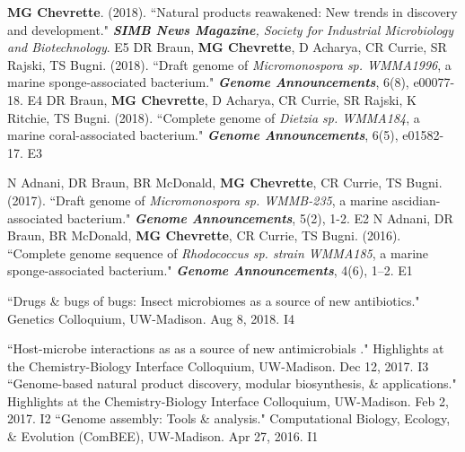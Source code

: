 \begin{cvpubs}
  \cvpub
    {\textbf{MG Chevrette}. (2018). ``Natural products reawakened: New trends in discovery and development." \textit{\textbf{SIMB News Magazine}, Society for Industrial Microbiology and Biotechnology}. }  %
    {E5} %
  \cvpub
    {DR Braun, \textbf{MG Chevrette}, D Acharya, CR Currie, SR Rajski, TS Bugni. (2018). ``Draft genome of \textit{Micromonospora sp. WMMA1996}, a marine sponge-associated bacterium." \textit{\textbf{Genome Announcements}}, 6(8), e00077-18. \textbf{\textit{}} }  %
    {E4} %
  \cvpub
    {DR Braun, \textbf{MG Chevrette}, D Acharya, CR Currie, SR Rajski, K Ritchie, TS Bugni. (2018). ``Complete genome of \textit{Dietzia sp. WMMA184}, a marine coral-associated bacterium." \textit{\textbf{Genome Announcements}}, 6(5), e01582-17. \textbf{\textit{}} } %
    {E3} %
\end{cvpubs}
\begin{cvpubs}
  \cvpub
    {N Adnani, DR Braun, BR McDonald, \textbf{MG Chevrette}, CR Currie, TS Bugni. (2017). ``Draft genome of \textit{Micromonospora sp. WMMB-235}, a marine ascidian-associated bacterium." \textit{\textbf{Genome Announcements}}, 5(2), 1-2. \textbf{\textit{}} } %
    {E2} %
  \cvpub
  {N Adnani, DR Braun, BR McDonald, \textbf{MG Chevrette}, CR Currie, TS Bugni. (2016). ``Complete genome sequence of \textit{Rhodococcus sp. strain WMMA185}, a marine sponge-associated bacterium." \textit{\textbf{Genome Announcements}}, 4(6), 1–2. \textbf{\textit{}}} %
    {E1} %
\end{cvpubs}


\begin{cvpubs} 
  \cvpub
    {``Drugs \& bugs of bugs: Insect microbiomes as a source of new antibiotics." Genetics Colloquium, UW-Madison. Aug 8, 2018.} %
    {I4} %
\end{cvpubs}
\begin{cvpubs}
  \cvpub
    {``Host-microbe interactions as as a source of new antimicrobials
." Highlights at the Chemistry-Biology Interface Colloquium, UW-Madison. Dec 12, 2017.} %
    {I3} %
  \cvpub
    {``Genome-based natural product discovery, modular biosynthesis, \& applications." Highlights at the Chemistry-Biology Interface Colloquium, UW-Madison. Feb 2, 2017.} %
    {I2} %
  \cvpub
    {``Genome assembly: Tools \& analysis." Computational Biology, Ecology, \& Evolution (ComBEE), UW-Madison. Apr 27, 2016.} %
    {I1} %
\end{cvpubs}


